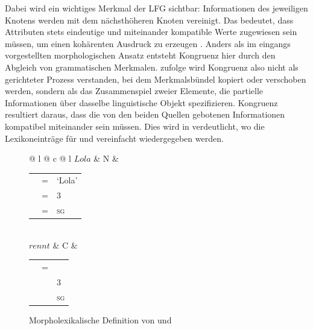 Dabei wird ein wichtiges Merkmal der LFG sichtbar: Informationen des jeweiligen
Knotens werden mit dem nächsthöheren Knoten vereinigt. Das bedeutet, dass
Attributen stets eindeutige und miteinander kompatible Werte
zugewiesen sein müssen, um einen kohärenten Ausdruck zu erzeugen
\autocite[vgl.][43--54]{bresnanetal2016}. Anders als im eingangs vorgestellten
morphologischen Ansatz entsteht Kongruenz hier durch den Abgleich von
grammatischen Merkmalen. \citet[7]{wechslerzlatic2003} zufolge wird Kongruenz
also nicht als gerichteter Prozess verstanden, bei dem Merkmalsbündel kopiert
oder verschoben werden, sondern als das Zusammenspiel zweier Elemente, die
partielle Informationen über dasselbe linguistische Objekt spezifizieren.
Kongruenz resultiert daraus, dass die von den beiden Quellen gebotenen
Informationen kompatibel miteinander sein müssen.
Dies wird in  verdeutlicht, wo die Lexikoneinträge für
 und  vereinfacht wiedergegeben werden.

\begin{figure}
\begin{tabular}[t]{@{} l @{\hspace{2em}} c @{\hspace{2em}} l}
	$Lola$
	&	N
	&	\begin{tabular}[t]{l l l}
			\ups{pred}	& =	& `Lola' \\
			\ups{pers}	& =	& 3 \\
			\ups{num}	& =	& \textsc{sg} \\
		\end{tabular}
	\medskip \\

	$rennt$
	&	C
	&	\begin{tabular}[t]{l l l}
			\ups{pred}		& = 	& \astruct{rennen}{\ups{subj}} \\
			\ups{subj pers}	& \req	& 3 \\
			\ups{subj num}	& \req	& \textsc{sg} \\
		\end{tabular}
\end{tabular}
\caption{Morpholexikalische Definition von  und }
\label{fig:lolamorphlex}
\end{figure}

